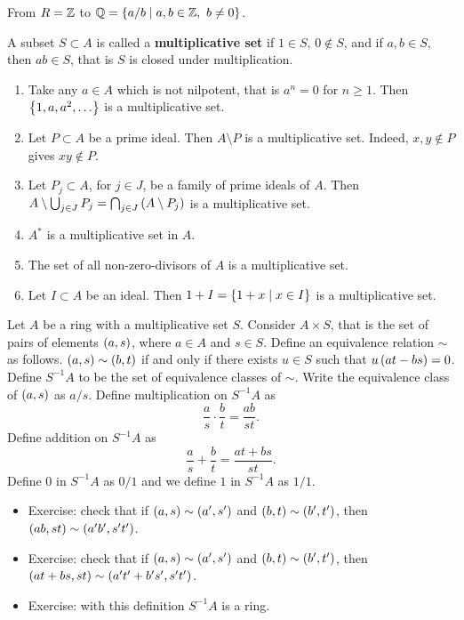 \begin{example*}
From $ R = \mathbb{Z} $ to $ \mathbb{Q} = \left\{ a / b \mid a, b \in \mathbb{Z}, \ b \ne 0 \right\} $.
\end{example*}

\begin{definition}
A subset $ S \subset A $ is called a \textbf{multiplicative set} if $ 1 \in S $, $ 0 \not\in S $, and if $ a, b \in S $, then $ ab \in S $, that is $ S $ is closed under multiplication.
\end{definition}

\begin{example*}
\hfill
\begin{enumerate}
\item Take any $ a \in A $ which is not nilpotent, that is $ a^n = 0 $ for $ n \ge 1 $. Then $ \cb{1, a, a^2, \dots} $ is a multiplicative set.
\item Let $ P \subset A $ be a prime ideal. Then $ A \setminus P $ is a multiplicative set. Indeed, $ x, y \notin P $ gives $ xy \notin P $.
\item Let $ P_j \subset A $, for $ j \in J $, be a family of prime ideals of $ A $. Then $ A \setminus \bigcup_{j \in J} P_j = \bigcap_{j \in J} \left( A \setminus P_j \right) $ is a multiplicative set.
\item $ A^* $ is a multiplicative set in $ A $.
\item The set of all non-zero-divisors of $ A $ is a multiplicative set.
\item Let $ I \subset A $ be an ideal. Then $ 1 + I = \left\{ 1 + x \mid x \in I \right\} $ is a multiplicative set.
\end{enumerate}
\end{example*}

\begin{definition}
Let $ A $ be a ring with a multiplicative set $ S $. Consider $ A \times S $, that is the set of pairs of elements $ \left( a, s \right) $, where $ a \in A $ and $ s \in S $. Define an equivalence relation $ \sim $ as follows. $ \left( a, s \right) \sim \left( b, t \right) $ if and only if there exists $ u \in S $ such that $ u\left( at - bs \right) = 0 $. Define $ S^{-1}A $ to be the set of equivalence classes of $ \sim $. Write the equivalence class of $ \left( a, s \right) $ as $ a / s $. Define multiplication on $ S^{-1}A $ as
$$ \dfrac{a}{s} \cdot \dfrac{b}{t} = \dfrac{ab}{st}. $$
Define addition on $ S^{-1}A $ as
$$ \dfrac{a}{s} + \dfrac{b}{t} = \dfrac{at + bs}{st}. $$
Define $ 0 $ in $ S^{-1}A $ as $ 0 / 1 $ and we define $ 1 $ in $ S^{-1}A $ as $ 1 / 1 $.
\begin{itemize}
\item Exercise: check that if $ \left( a, s \right) \sim \left( a', s' \right) $ and $ \left( b, t \right) \sim \left( b', t' \right) $, then $ \left( ab, st \right) \sim \left( a'b', s't' \right) $.
\item Exercise: check that if $ \left( a, s \right) \sim \left( a', s' \right) $ and $ \left( b, t \right) \sim \left( b', t' \right) $, then $ \left( at + bs, st \right) \sim \left( a't' + b's', s't' \right) $.
\item Exercise: with this definition $ S^{-1}A $ is a ring.
\end{itemize}
\end{definition}

